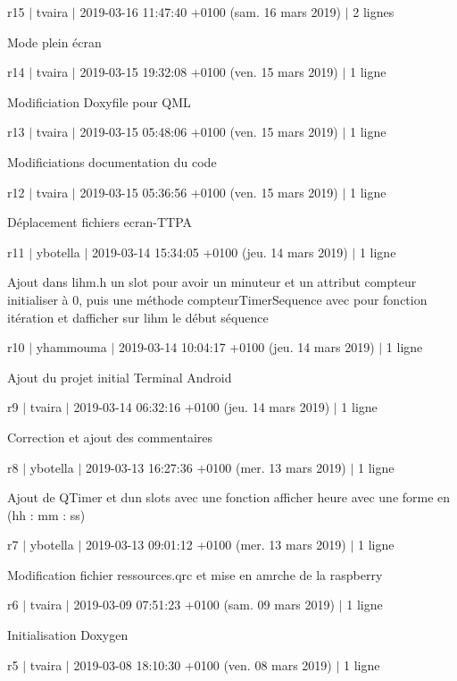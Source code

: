r15 $\vert$ tvaira $\vert$ 2019-\/03-\/16 11\+:47\+:40 +0100 (sam. 16 mars 2019) $\vert$ 2 lignes

Mode plein écran

r14 $\vert$ tvaira $\vert$ 2019-\/03-\/15 19\+:32\+:08 +0100 (ven. 15 mars 2019) $\vert$ 1 ligne

Modificiation Doxyfile pour Q\+ML

r13 $\vert$ tvaira $\vert$ 2019-\/03-\/15 05\+:48\+:06 +0100 (ven. 15 mars 2019) $\vert$ 1 ligne

Modificiations documentation du code

r12 $\vert$ tvaira $\vert$ 2019-\/03-\/15 05\+:36\+:56 +0100 (ven. 15 mars 2019) $\vert$ 1 ligne

Déplacement fichiers ecran-\/\+T\+T\+PA

r11 $\vert$ ybotella $\vert$ 2019-\/03-\/14 15\+:34\+:05 +0100 (jeu. 14 mars 2019) $\vert$ 1 ligne

Ajout dans l\textquotesingle{}ihm.\+h un slot pour avoir un minuteur et un attribut compteur initialiser à 0, puis une méthode compteur\+Timer\+Sequence avec pour fonction itération et d\textquotesingle{}afficher sur l\textquotesingle{}ihm le début séquence

r10 $\vert$ yhammouma $\vert$ 2019-\/03-\/14 10\+:04\+:17 +0100 (jeu. 14 mars 2019) $\vert$ 1 ligne

Ajout du projet initial Terminal Android

r9 $\vert$ tvaira $\vert$ 2019-\/03-\/14 06\+:32\+:16 +0100 (jeu. 14 mars 2019) $\vert$ 1 ligne

Correction et ajout des commentaires

r8 $\vert$ ybotella $\vert$ 2019-\/03-\/13 16\+:27\+:36 +0100 (mer. 13 mars 2019) $\vert$ 1 ligne

Ajout de Q\+Timer et d\textquotesingle{}un slots avec une fonction afficher heure avec une forme en (hh \+: mm \+: ss)

r7 $\vert$ ybotella $\vert$ 2019-\/03-\/13 09\+:01\+:12 +0100 (mer. 13 mars 2019) $\vert$ 1 ligne

Modification fichier ressources.\+qrc et mise en amrche de la raspberry

r6 $\vert$ tvaira $\vert$ 2019-\/03-\/09 07\+:51\+:23 +0100 (sam. 09 mars 2019) $\vert$ 1 ligne

Initialisation Doxygen

r5 $\vert$ tvaira $\vert$ 2019-\/03-\/08 18\+:10\+:30 +0100 (ven. 08 mars 2019) $\vert$ 1 ligne

